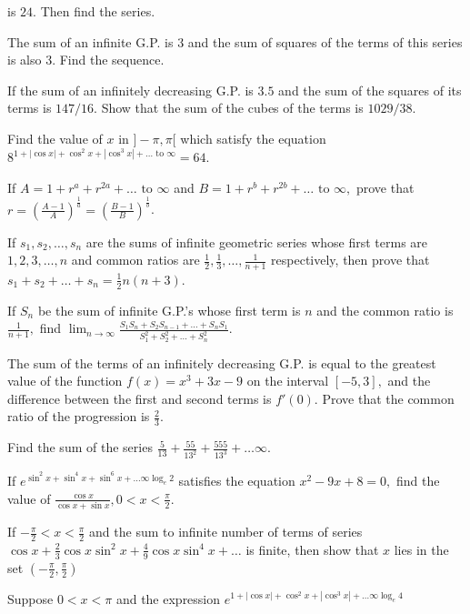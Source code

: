   is $24.$ Then find the series.
\item The sum of an infinite G.P. is $3$ and the sum of squares of the terms of this series is also $3.$ Find the sequence.
\item If the sum of an infinitely decreasing G.P. is $3.5$ and the sum of the squares of its terms is $147/16.$ Show that
  the sum of the cubes of the terms is $1029/38$.
\item Find the value of $x$ in $]-\pi, \pi[$ which satisfy the equation $8^{1 + |\cos x| + \cos^2 x + |\cos^3 x| + \ldots
      \text{~to~}\infty} = 64$.
\item If $A = 1 + r^a + r^{2a} + \ldots \text{~to~}\infty$ and $B = 1 + r^b + r^{2b} + \ldots \text{~to~}\infty,$ prove
  that $r = \left(\frac{A - 1}{A}\right)^{\frac{1}{a}} = \left(\frac{B - 1}{B}\right)^{\frac{1}{b}}$.
\item If $s_1, s_2, \ldots, s_n$ are the sums of infinite geometric series whose first terms are $1, 2, 3, \ldots, n$ and
  common ratios are $\frac{1}{2}, \frac{1}{3}, \ldots, \frac{1}{n + 1}$ respectively, then prove that $s_1 + s_2 + \ldots + s_n =
  \frac{1}{2}n(n + 3)$.
\item If $S_n$ be the sum of infinite G.P.'s whose first term is $n$ and the common ratio is $\frac{1}{n + 1},$ find
  $\displaystyle\lim_{n\to \infty} \frac{S_1S_n + S_2S_{n - 1} + \ldots + S_nS_1}{S_1^2 + S_2^2 + \ldots + S_n^2}$.
\item The sum of the terms of an infinitely decreasing G.P. is equal to the greatest value of the function $f(x) = x^3 +
  3x - 9$ on the interval $[-5, 3],$ and the difference between the first and second terms is $f'(0).$ Prove that the common ratio
  of the progression is $\frac{2}{3}$.
\item Find the sum of the series $\frac{5}{13} + \frac{55}{13^2} + \frac{555}{13^3} + \ldots \infty$.
\item If $e^{{\sin^2x + \sin^4x + \sin^6x + \ldots \infty}\log_e2}$ satisfies the equation $x^2 - 9x + 8 = 0,$ find the
  value of $\frac{\cos x}{\cos x + \sin x}, 0 < x < \frac{\pi}{2}$.
\item If $-\frac{\pi}{2} < x < \frac{\pi}{2}$ and the sum to infinite number of terms of series $\cos x + \frac{2}{3}\cos
  x\sin^2x + \frac{4}{9}\cos x\sin^4x + \ldots$ is finite, then show that $x$ lies in the set $\left(-\frac{\pi}{2},
  \frac{\pi}{2}\right)$
\item Suppose $0 < x < \pi$ and the expression $e^{{1 + |\cos x| + \cos^2x + |\cos^3x| + \ldots \infty}\log_e 4}$

